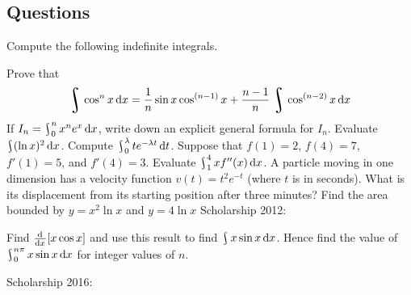 \subsection*{Questions}
\begin{questions}
  \questioS Compute the following indefinite integrals.
  \questioS Prove that
    \begin{displaymath}
      \rint \cos^n x \dif{x} = \frac{1}{n} \sin x \cos^{(n - 1)} x + \frac{n-1}{n} \rint \cos^{(n - 2)} x \dif{x}
    \end{displaymath}
  \questioS If $ I_n = \rint^{n}_0 x^n e^x \dif{x} $, write down an explicit general formula for $ I_n $.
  \questioS Evaluate $ \rint (\ln x)^2 \dif{x} $.
  \questioS Compute $ \rint^\lambda_0 te^{-\lambda t} \dif{t} $.
  \questioS Suppose that $ f(1) = 2 $, $ f(4) = 7 $, $ f'(1) = 5 $, and $ f'(4) = 3 $. Evaluate $ \rint^4_1 xf''(x) \dif{x} $.
  \questioS A particle moving in one dimension has a velocity function $ v(t) = t^2 e^{-t} $ (where $ t $ is in seconds). What is its displacement from its
            starting position after three minutes?
  \questioS Find the area bounded by $ y = x^2 \ln x $ and $ y = 4\ln x $
  \question Scholarship 2012:
    \begin{parts}
      \parE Find $ \od{}{x}[x \cos x] $ and use this result to find $ \rint x \sin x \dif{x} $.
      \parS Hence find the value of $ \rint^{n\pi}_0 x \sin x \dif{x} $ for integer values of $ n $.
    \end{parts}
  \questioO Scholarship 2016:
    \begin{parts}

\end{parts}
\end{questions}
